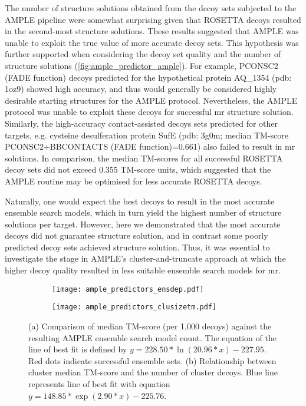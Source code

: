 The number of structure solutions obtained from the decoy sets subjected to the AMPLE pipeline were somewhat surprising given that ROSETTA decoys resulted in the second-most structure solutions. These results suggested that AMPLE was unable to exploit the true value of more accurate decoy sets. This hypothesis was further supported when considering the decoy set quality and the number of structure solutions (\cref{fig:ample_predictor_ample}). For example, PCONSC2 (FADE function) decoys predicted for the hypothetical protein AQ\_1354 (\gls{pdb}: 1oz9) showed high accuracy, and thus would generally be considered highly desirable starting structures for the AMPLE protocol. Nevertheless, the AMPLE protocol was unable to exploit these decoys for successful \gls{mr} structure solution. Similarly, the high-accuracy contact-assisted decoys sets predicted for other targets, e.g. cysteine desulferation protein SufE (\gls{pdb}: 3g0m; median TM-score PCONSC2+BBCONTACTS (FADE function)=0.661) also failed to result in \gls{mr} solutions. In comparison, the median TM-scores for all successful ROSETTA decoy sets did not exceed 0.355 TM-score units, which suggested that the AMPLE routine may be optimised for less accurate ROSETTA decoys.

Naturally, one would expect the best decoys to result in the most accurate ensemble search models, which in turn yield the highest number of structure solutions per target. However, here we demonstrated that the most accurate decoys did not guarantee structure solution, and in contrast some poorly predicted decoy sets achieved structure solution. Thus, it was essential to investigate the stage in AMPLE's cluster-and-truncate approach at which the higher decoy quality resulted in less suitable ensemble search models for \gls{mr}.

\begin{figure}[H]
    \centering
    \begin{subfigure}[b]{0.49\textwidth}
        \centering
        \texttt{[image: ample\_predictors\_ensdep.pdf]}
        \caption{}
        \label{fig:ample_predictor_ensdep}
    \end{subfigure}
    \begin{subfigure}[b]{0.49\textwidth}
        \centering
        \texttt{[image: ample\_predictors\_clusizetm.pdf]}
        \caption{}
        \label{fig:ample_predictor_clusizetm}
    \end{subfigure}

    \caption[SPICKER cluster analysis in relation to TM-score and AMPLE ensembles]{(a) Comparison of median TM-score (per 1,000 decoys) against the resulting AMPLE ensemble search model count. The equation of the line of best fit is defined by $y=228.50*\ln\left(20.96*x\right)-227.95$. Red dots indicate successful ensemble sets. (b) Relationship between cluster median TM-score and the number of cluster decoys. Blue line represents line of best fit with equation $y=148.85*\exp\left(2.90*x\right)-225.76$.}
\end{figure}

